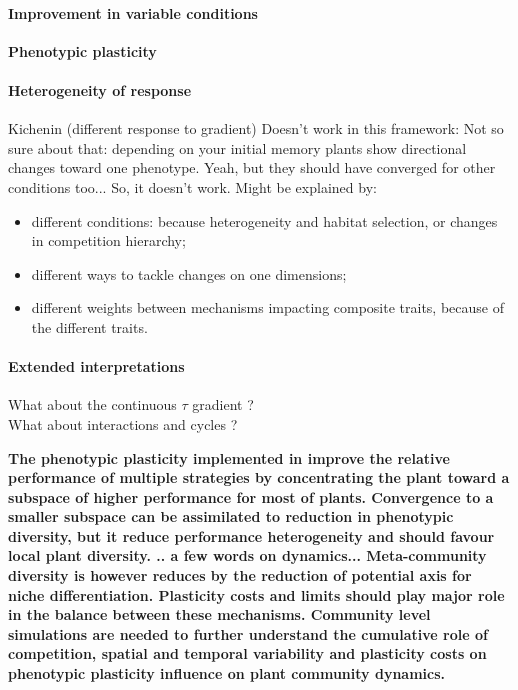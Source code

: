 \paragraph{Improvement in variable conditions}

\textbf{Phenotypic plasticity }

\paragraph{Heterogeneity of response}

Kichenin (different response to gradient) Doesn't work in this framework: Not so sure about that: depending on your initial memory plants show directional changes toward one phenotype. Yeah, but they should have converged for other conditions too... So, it doesn't work. Might be explained by:
\begin{itemize}
\item different conditions: because heterogeneity and habitat selection, or changes in competition hierarchy;
\item different ways to tackle changes on one dimensions;
\item different weights between mechanisms impacting composite traits, because of the different traits.
\end{itemize}



\paragraph{Extended interpretations}
What about the continuous $\tau$ gradient ?\\
What about interactions and cycles ?



\textbf{The phenotypic plasticity implemented in \model improve the relative performance of multiple strategies by concentrating the plant toward a subspace of higher performance for most of plants. Convergence to a smaller subspace can be assimilated to reduction in phenotypic diversity, but it reduce performance heterogeneity and should favour local plant diversity. .. a few words on dynamics... Meta-community diversity is however reduces by the reduction of potential axis for niche differentiation. Plasticity costs and limits should play major role in the balance between these mechanisms. Community level simulations are needed to further understand the cumulative role of competition, spatial and temporal variability and plasticity costs on phenotypic plasticity influence on plant community dynamics.}

